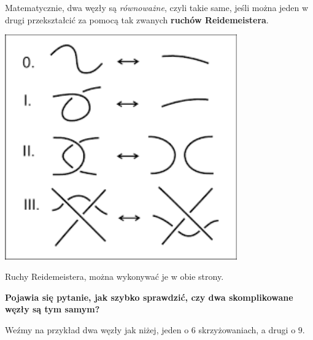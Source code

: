 \documentclass{article}
\begin{document}
Matematycznie, dwa węzły są \emph{równoważne}, czyli takie same, jeśli można jeden w drugi przekształcić za pomocą tak zwanych \textbf{ruchów Reidemeistera}.

\begin{center}
  \includegraphics[width=10cm]{reidemeister_moves.png}

  Ruchy Reidemeistera, można wykonywać je w obie strony.
\end{center}

{\centering\bfseries\large\color{green!70!black}
  Pojawia się pytanie, jak szybko sprawdzić, czy dwa skomplikowane węzły są tym samym?
}

Weźmy na przykład dwa węzły jak niżej, jeden o $6$ skrzyżowaniach, a drugi o $9$.
\end{document}
